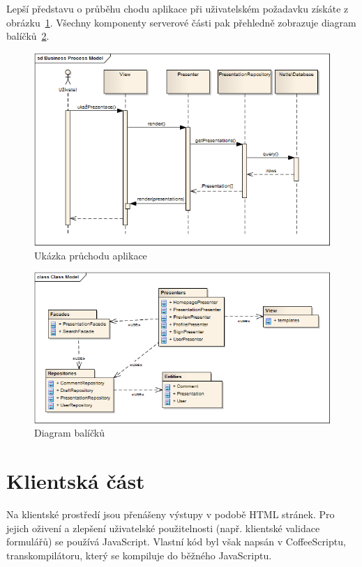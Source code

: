 \documentclass[11pt,twoside,a4paper]{book}
\begin{document}
Lepší představu o průběhu chodu aplikace při uživatelském požadavku získáte z obrázku~\ref{fig:logika}. Všechny komponenty serverové části pak přehledně zobrazuje diagram balíčků~\ref{fig:balicky}.


\begin{figure}[ht]
	\begin{center}
		\includegraphics[width=14cm]{PRO-img/logika.png}
		\caption{Ukázka průchodu aplikace}
		\label{fig:logika}
	\end{center}
\end{figure}

\begin{figure}[ht]
	\begin{center}
		\includegraphics[width=14cm]{PRO-img/balicky.png}
		\caption{Diagram balíčků}
		\label{fig:balicky}
	\end{center}
\end{figure}


\section{Klientská část}
Na klientské prostředí jsou přenášeny výstupy v podobě HTML stránek. Pro jejich oživení a zlepšení uživatelské použitelnosti (např. klientské validace formulářů) se používá JavaScript. Vlastní kód byl však napsán v CoffeeScriptu\cite{coffee}, transkompilátoru, který se kompiluje do běžného JavaScriptu. 
\end{document}
